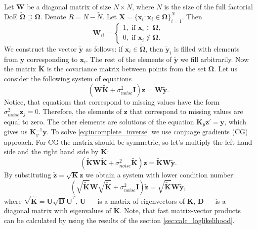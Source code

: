 Let $\mathbf{W}$ be a diagonal matrix of size $N \times N$,
where $N$ is the size of the full factorial DoE
$\boldsymbol{\widetilde{\Omega}} \supseteq \boldsymbol{\Omega}$.
Denote $R = N - \widetilde{N}$.
Let
$\mathbf{X} =
\{\mathbf{x}_i: \mathbf{x}_i \in \boldsymbol{\Omega}\}_{i = 1}^{N}$.
Then
\begin{equation*}
\mathbf{W}_{ii} =
\begin{cases}
    1, \mbox{ if } \mathbf{x}_i \in \boldsymbol{\Omega}, \\
    0, \mbox{ if } \mathbf{x}_i \notin \boldsymbol{\Omega}.
\end{cases}
\end{equation*}
We construct the vector $\mathbf{\widetilde{y}}$ as follows:
if $\mathbf{x}_i \in \boldsymbol{\widetilde{\Omega}}$,
then $\mathbf{\widetilde{y}}_i$ is filled with elements from $\mathbf{y}$
corresponding to $\mathbf{x}_i$.
The rest of the elements of $\mathbf{\widetilde{y}}$ we fill arbitrarily.
Now the matrix $\mathbf{\widetilde{K}}$ is the covariance matrix between points from
the set $\boldsymbol{\Omega}$.
Let us consider the following system of equations
\begin{equation}
\label{eq:incomplete_inverse}
\left (\mathbf{W \widetilde{K}} + \sigma^2_{noise}\mathbf{I} \right )\mathbf{z} =
\mathbf{W\widetilde{y}}.
\end{equation}
Notice, that equations that correspond to missing values
have the form $\sigma_{noise}^2 \mathbf{z}_j = 0$.
Therefore, the elements of $\mathbf{z}$ that correspond to missing values are equal to zero.
The other elements are solutions of the equation $\mathbf{K}_y \mathbf{z}' = \mathbf{y}$,
which gives us $\mathbf{K}_y^{-1}\mathbf{y}$.
To solve \eqref{eq:incomplete_inverse} we use conjuage gradients (CG) approach.
For CG the matrix should be symmetric, so let's multiply the left hand side and the right hand
side by
$\mathbf{\widetilde{K}}$:
\[
\left (\mathbf{\widetilde{K} W \widetilde{K}} + \sigma^2_{noise}\mathbf{\widetilde{K}} \right) \mathbf{z} =
\mathbf{\widetilde{K}}\mathbf{W\widetilde{y}}.
\]
By substituting $\mathbf{\widetilde{z}} = \mathbf{\sqrt{K} z}$ we obtain
a system with lower condition number:
\[
\left (\mathbf{\sqrt{\widetilde{K}} W \sqrt{\widetilde{K}}} + \sigma^2_{noise} \mathbf{I} \right )\mathbf{\widetilde{z}} =
\mathbf{\sqrt{\widetilde{K}} W \widetilde{y}},
\]
where $\mathbf{\sqrt{\widetilde{K}}} = \mathbf{U \sqrt{D} U}^T$, $\mathbf{U}$ --- is a
matrix of eigenvectors of
$\mathbf{\widetilde{K}}$,
$\mathbf{D}$ --- is a diagonal matrix with eigenvalues of $\mathbf{\widetilde{K}}$.
Note, that fast matrix-vector products can be calculated by using the results of
the section \ref{sec:calc_loglikelihood}.

